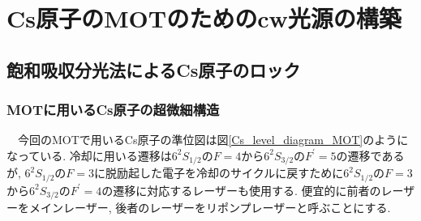 \documentclass[uplatex, dvipdfmx, a4paper, report, papersize, 11pt]{jsbook}
\begin{document}
\chapter{Cs原子のMOTのためのcw光源の構築}
\section{飽和吸収分光法によるCs原子のロック}
\subsection{MOTに用いるCs原子の超微細構造}
　今回のMOTで用いるCs原子の準位図は図\ref{Cs_level_diagram_MOT}のようになっている. 冷却に用いる遷移は$6 ^ { 2 } S _ { 1 / 2 }$の$F = 4$から$6 ^ { 2 } S _ { 3 / 2 }$の$F ^ { \prime } = 5$の遷移であるが, $6 ^ { 2 } S _ { 1 / 2 }$の$F = 3$に脱励起した電子を冷却のサイクルに戻すために$6 ^ { 2 } S _ { 1 / 2 }$の$F = 3$
から$6 ^ { 2 } S _ { 3 / 2 }$の$F ^ { \prime } = 4$の遷移に対応するレーザーも使用する. 便宜的に前者のレーザーをメインレーザー, 後者のレーザーをリポンプレーザーと呼ぶことにする.
\end{document}
